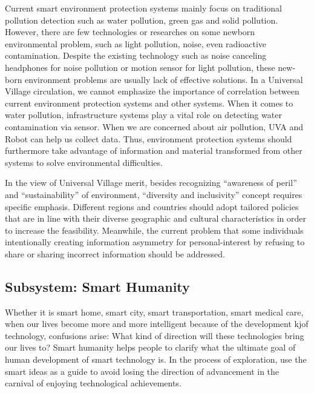 \documentclass[letterpaper, twocolumn, 10pt, conference]{IEEEtran}
\begin{document}
Current smart environment protection systems mainly focus on traditional pollution detection such as water pollution, green gas and solid pollution. However, there are few technologies or researches on some newborn environmental problem, such as light pollution, noise, even radioactive contamination. Despite the existing technology such as noise canceling headphones  for noise pollution or motion sensor for light pollution, these new-born environment problems are usually lack of effective solutions. In a Universal Village circulation, we cannot emphasize the importance of correlation between current environment protection systems and other systems. When it comes to water pollution, infrastructure systems play a vital role on detecting water contamination via sensor. When we are concerned about air pollution, UVA and Robot can help us collect data. Thus, environment protection systems should furthermore take advantage of information and material transformed from other systems to solve environmental difficulties.
 
In the view of Universal Village merit, besides recognizing  \enquote{awareness of peril} and \enquote{sustainability} of environment, \enquote{diversity and inclusivity} concept requires specific emphasis. Different regions and countries should adopt tailored policies that are in line with their diverse geographic and cultural characteristics in order to increase the feasibility. Meanwhile, the current problem that some individuals intentionally creating information asymmetry for personal-interest by refusing to share or sharing incorrect information should be addressed.




\subsection{Subsystem: Smart Humanity}
\label{ssec:css:smart_humanity}

Whether it is smart home, smart city, smart transportation, smart medical care, when our lives become more and more intelligent because of the development kjof technology, confusions arise: What kind of direction will these technologies bring our lives to? Smart humanity helps people to clarify what the ultimate goal of human development of smart technology is. In the process of exploration, use the smart ideas as a guide to avoid losing the direction of advancement in the carnival of enjoying technological achievements.
\end{document}
